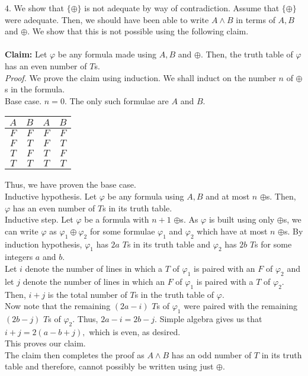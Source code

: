 \documentclass{article}
\begin{document}
4. We show that $\{\oplus\}$ is not adequate by way of contradiction. Assume that $\{\oplus\}$ were adequate. Then, we should have been able to write $A \wedge B$ in terms of $A, B$ and $\oplus.$ We show that this is not possible using the following claim.\\~\\
\textbf{Claim:} Let $\varphi$ be any formula made using $A, B$ and $\oplus.$ Then, the truth table of $\varphi$ has an even number of $T$s.\\
\emph{Proof.} We prove the claim using induction. We shall induct on the number $n$ of $\oplus$s in the formula.\\
Base case. $n = 0.$ The only such formulae are $A$ and $B.$
\begin{center}

\begin{tabular}{|c|c|c|c|}
	\hline
	$A$ & $B$ & $A$ & $B$ \\
	\hline
	$F$ & $F$ & $F$ & $F$ \\
	\hline
	$F$ & $T$ & $F$ & $T$ \\
	\hline
	$T$ & $F$ & $T$ & $F$ \\
	\hline
	$T$ & $T$ & $T$ & $T$ \\
	\hline
\end{tabular}

\end{center}
Thus, we have proven the base case.\\
Inductive hypothesis. Let $\varphi$ be any formula using $A, B$ and at most $n$ $\oplus$s. Then, $\varphi$ has an even number of $T$s in its truth table.\\
Inductive step. Let $\varphi$ be a formula with $n+1$ $\oplus$s. As $\varphi$ is built using only $\oplus$s, we can write $\varphi$ as $\varphi_1 \oplus \varphi_2$ for some formulae $\varphi_1$ and $\varphi_2$ which have at most $n$ $\oplus$s. By induction hypothesis, $\varphi_1$ has $2a$ $T$s in its truth table and $\varphi_2$ has $2b$ $T$s for some integers $a$ and $b.$\\
Let $i$ denote the number of lines in which a $T$ of $\varphi_1$ is paired with an $F$ of $\varphi_2$ and let $j$ denote the number of lines in which an $F$ of $\varphi_1$ is paired with a $T$ of $\varphi_2.$ Then, $i + j$ is the total number of $T$s in the truth table of $\varphi.$\\
Now note that the remaining $(2a - i)$ $T$s of $\varphi_1$ were paired with the remaining $(2b - j)$ $T$s of $\varphi_2.$ Thus, $2a - i = 2b - j.$ Simple algebra gives us that $i + j = 2(a - b + j),$ which is even, as desired.\\
This proves our claim.\\
The claim then completes the proof as $A \wedge B$ has an odd number of $T$ in its truth table and therefore, cannot possibly be written using just $\oplus.$
\end{document}

